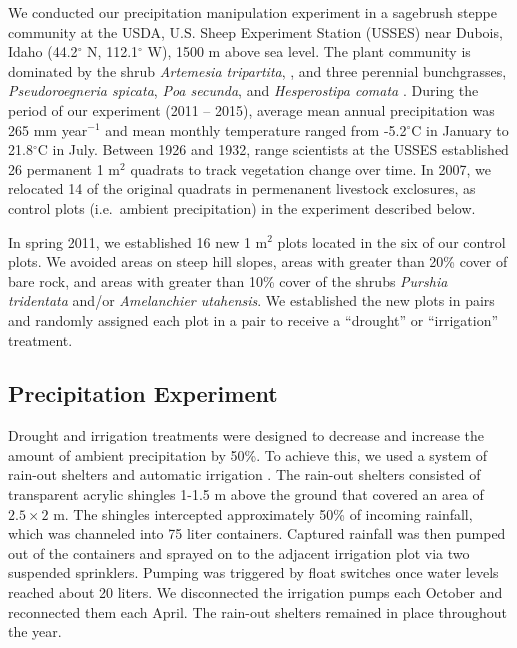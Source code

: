 \documentclass[fleqn,10pt,lineno]{wlpeerj} %
\begin{document}
We conducted our precipitation manipulation experiment in a sagebrush
steppe community at the USDA, U.S. Sheep Experiment Station (USSES) near
Dubois, Idaho (44.2\(^{\circ}\) N, 112.1\(^{\circ}\) W), 1500 m above
sea level. The plant community is dominated by the shrub
\emph{Artemesia tripartita},
, and three
perennial bunchgrasses, \emph{Pseudoroegneria spicata},
\emph{Poa secunda}, and \emph{Hesperostipa comata}
. During the period of
our experiment (2011 -- 2015), average mean annual precipitation was 265
mm year\(\phantom{}^{-1}\) and mean monthly temperature ranged from
-5.2\(^{\circ}\)C in January to 21.8\(^{\circ}\)C in July. Between 1926
and 1932, range scientists at the USSES established 26 permanent 1
m\(^2\) quadrats to track vegetation change over time. In 2007, we
relocated 14 of the original quadrats in permenanent livestock
exclosures,  as control plots (i.e.~ambient
precipitation) in the experiment described below.

In spring 2011, we established 16 new 1 m\(^2\) plots located in the
 six of our
control plots. We avoided areas on steep hill slopes, areas with greater
than 20\% cover of bare rock, and areas with greater than 10\% cover of
the shrubs \emph{Purshia tridentata} and/or
\emph{Amelanchier utahensis}. We established the new plots in pairs and
randomly assigned each plot in a pair to receive a ``drought'' or
``irrigation'' treatment.

\hypertarget{precipitation-experiment}{%
\subsection{Precipitation Experiment}\label{precipitation-experiment}}

Drought and irrigation treatments were designed to decrease and increase
the amount of ambient precipitation by 50\%. To achieve this, we used a
system of rain-out shelters and automatic irrigation
\citep{Gherardi2013}. The rain-out shelters consisted of transparent
acrylic shingles 1-1.5 m above the ground that covered an area of
\(2.5\times2\) m. The shingles intercepted approximately 50\% of
incoming rainfall, which was channeled into 75 liter containers.
Captured rainfall was then pumped out of the containers and sprayed on
to the adjacent irrigation plot via two suspended sprinklers. Pumping
was triggered by float switches once water levels reached about 20
liters. We disconnected the irrigation pumps each October and
reconnected them each April. The rain-out shelters remained in place
throughout the year.
\end{document}
